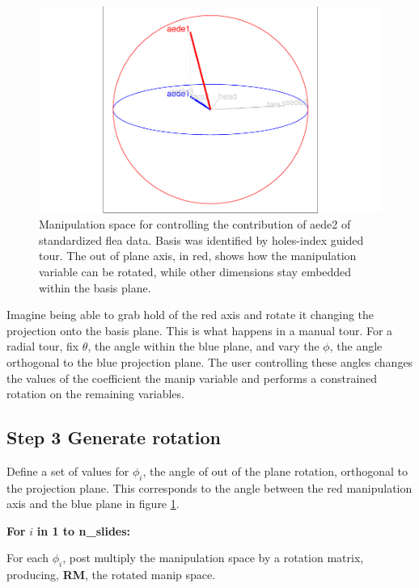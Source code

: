 \documentclass{monashthesis}
\begin{document}
\begin{figure}

{\centering \includegraphics[width=1\linewidth]{thesis_files/figure-latex/step2-1} 

}

\caption{Manipulation space for controlling the contribution of aede2 of standardized flea data. Basis was identified by holes-index guided tour. The out of plane axis, in red, shows how the manipulation variable can be rotated, while other dimensions stay embedded within the basis plane.}\label{fig:step2}
\end{figure}

Imagine being able to grab hold of the red axis and rotate it changing
the projection onto the basis plane. This is what happens in a manual
tour. For a radial tour, fix \(\theta\), the angle within the blue
plane, and vary the \(\phi\), the angle orthogonal to the blue
projection plane. The user controlling these angles changes the values
of the coefficient the manip variable and performs a constrained
rotation on the remaining variables.

\subsection{Step 3 Generate rotation}\label{step-3-generate-rotation}

Define a set of values for \(\phi_i\), the angle of out of the plane
rotation, orthogonal to the projection plane. This corresponds to the
angle between the red manipulation axis and the blue plane in figure
\ref{fig:step2}.

\textbf{For } \(i\) \textbf{in 1 to n\_slides:}

For each \(\phi_i\), post multiply the manipulation space by a rotation
matrix, producing, \textbf{RM}, the rotated manip space.
\end{document}
